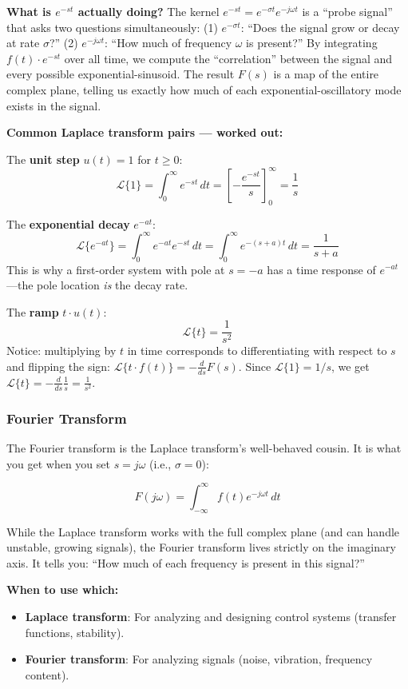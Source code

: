\textbf{What is $e^{-st}$ actually doing?} The kernel $e^{-st} = e^{-\sigma t} e^{-j\omega t}$ is a ``probe signal'' that asks two questions simultaneously: (1) $e^{-\sigma t}$: ``Does the signal grow or decay at rate $\sigma$?'' (2) $e^{-j\omega t}$: ``How much of frequency $\omega$ is present?'' By integrating $f(t) \cdot e^{-st}$ over all time, we compute the ``correlation'' between the signal and every possible exponential-sinusoid. The result $F(s)$ is a map of the entire complex plane, telling us exactly how much of each exponential-oscillatory mode exists in the signal.

\textbf{Common Laplace transform pairs --- worked out:}

The \textbf{unit step} $u(t) = 1$ for $t \geq 0$:
\[
\mathcal{L}\{1\} = \int_0^{\infty} e^{-st} \, dt = \left[-\frac{e^{-st}}{s}\right]_0^{\infty} = \frac{1}{s}
\]

The \textbf{exponential decay} $e^{-at}$:
\[
\mathcal{L}\{e^{-at}\} = \int_0^{\infty} e^{-at} e^{-st} \, dt = \int_0^{\infty} e^{-(s+a)t} \, dt = \frac{1}{s+a}
\]
This is why a first-order system with pole at $s = -a$ has a time response of $e^{-at}$---the pole location \textit{is} the decay rate.

The \textbf{ramp} $t \cdot u(t)$:
\[
\mathcal{L}\{t\} = \frac{1}{s^2}
\]
Notice: multiplying by $t$ in time corresponds to differentiating with respect to $s$ and flipping the sign: $\mathcal{L}\{t \cdot f(t)\} = -\frac{d}{ds}F(s)$. Since $\mathcal{L}\{1\} = 1/s$, we get $\mathcal{L}\{t\} = -\frac{d}{ds}\frac{1}{s} = \frac{1}{s^2}$.

\subsubsection{Fourier Transform}

The Fourier transform is the Laplace transform's well-behaved cousin. It is what you get when you set $s = j\omega$ (i.e., $\sigma = 0$):

\begin{equation}
F(j\omega) = \int_{-\infty}^{\infty} f(t) e^{-j\omega t} \, dt
\end{equation}

While the Laplace transform works with the full complex plane (and can handle unstable, growing signals), the Fourier transform lives strictly on the imaginary axis. It tells you: ``How much of each frequency is present in this signal?''

\textbf{When to use which:}
\begin{itemize}
    \item \textbf{Laplace transform}: For analyzing and designing control systems (transfer functions, stability).
    \item \textbf{Fourier transform}: For analyzing signals (noise, vibration, frequency content).
\end{itemize}

